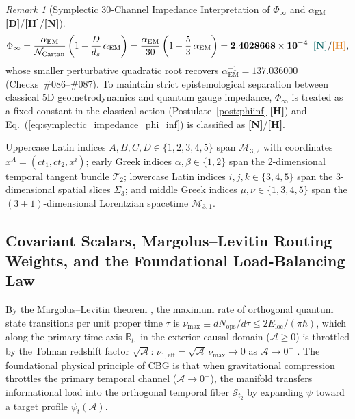 \documentclass[11pt,a4paper]{article}
\newcommand{\catD}{\textbf{\textcolor{blue!75!black}{[D]}}}
\newcommand{\catH}{\textbf{\textcolor{orange!85!black}{[H]}}}
\newcommand{\catN}{\textbf{\textcolor{teal!75!black}{[N]}}}
\theoremstyle{definition}
\theoremstyle{remark}
\newtheorem{remark}[theorem]{Remark}
\begin{document}
\begin{remark}[Symplectic 30-Channel Impedance Interpretation of $\Phi_\infty$ and $\alpha_{\text{EM}}$ \catD/\catH/\catN]
\begin{equation}
  \Phi_\infty = \frac{\alpha_{\text{EM}}}{\mathcal{N}_{\text{Cartan}}}\left(1 - \frac{D}{d_s}\,\alpha_{\text{EM}}\right) = \frac{\alpha_{\text{EM}}}{30}\left(1 - \frac{5}{3}\,\alpha_{\text{EM}}\right) = \mathbf{2.4028668 \times 10^{-4}} \;\;\catN/\catH,
  \label{eq:symplectic_impedance_phi_inf}
\end{equation}
whose smaller perturbative quadratic root recovers $\alpha_{\text{EM}}^{-1} = \mathbf{137.036000}$ (Checks~\#086--\#087). To maintain strict epistemological separation between classical 5D geometrodynamics and quantum gauge impedance, $\Phi_\infty$ is treated as a fixed constant in the classical action (Postulate~\ref{post:phiinf} \catH) and Eq.~(\ref{eq:symplectic_impedance_phi_inf}) is classified as \catN/\catH.
\end{remark}

Uppercase Latin indices $A, B, C, D \in \{1, 2, 3, 4, 5\}$ span $\mathcal{M}_{3,2}$ with coordinates $x^A = (c t_1, c t_2, x^i)$; early Greek indices $\alpha, \beta \in \{1, 2\}$ span the 2-dimensional temporal tangent bundle $\mathcal{T}_2$; lowercase Latin indices $i, j, k \in \{3, 4, 5\}$ span the 3-dimensional spatial slices $\Sigma_3$; and middle Greek indices $\mu, \nu \in \{1, 3, 4, 5\}$ span the $(3+1)$-dimensional Lorentzian spacetime $\mathcal{M}_{3,1}$.

\subsection{\texorpdfstring{Covariant Scalars, Margolus--Levitin Routing Weights, and the Foundational Load-Balancing Law}{Covariant Scalars, Margolus-Levitin Routing Weights, and the Foundational Load-Balancing Law}}

By the Margolus--Levitin theorem \cite{MargolusLevitin1998,Lloyd2000}, the maximum rate of orthogonal quantum state transitions per unit proper time $\tau$ is $\nu_{\max} \equiv dN_{\text{ops}}/d\tau \le 2E_{\text{loc}}/(\pi\hbar)$, which along the primary time axis $\mathbb{R}_{t_1}$ in the exterior causal domain ($\mathcal{A} \ge 0$) is throttled by the Tolman redshift factor $\sqrt{\mathcal{A}}$: $\nu_{1,\text{eff}} = \sqrt{\mathcal{A}}\,\nu_{\max} \to 0$ as $\mathcal{A} \to 0^+$ \cite{Bekenstein1973,Bekenstein1981}. The foundational physical principle of CBG is that when gravitational compression throttles the primary temporal channel ($\mathcal{A} \to 0^+$), the manifold transfers informational load into the orthogonal temporal fiber $\mathcal{S}_{t_2}$ by expanding $\psi$ toward a target profile $\psi_t(\mathcal{A})$.
\end{document}
